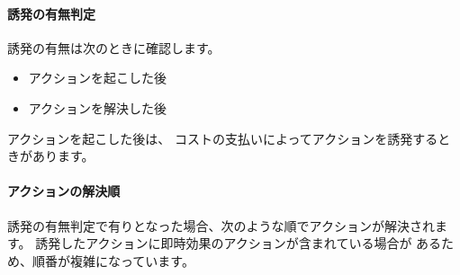 \documentclass[letterpaper,10pt,dvipdfmx]{sphinxmanual}
\begin{document}
\paragraph{誘発の有無判定}
\label{\detokenize{common/05-action_detail:id9}}
誘発の有無は次のときに確認します。
\begin{itemize}
\item {} 
アクションを起こした後

\item {} 
アクションを解決した後

\end{itemize}

アクションを起こした後は、
コストの支払いによってアクションを誘発するときがあります。


\paragraph{アクションの解決順}
\label{\detokenize{common/05-action_detail:id10}}
誘発の有無判定で有りとなった場合、次のような順でアクションが解決されます。
誘発したアクションに即時効果のアクションが含まれている場合が
あるため、順番が複雑になっています。
\end{document}
